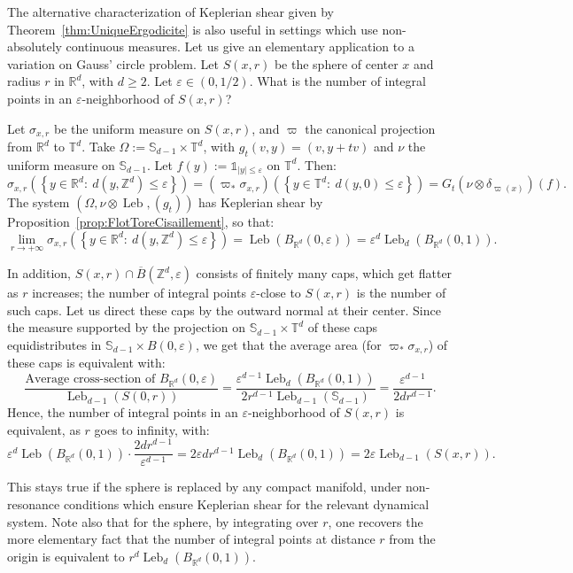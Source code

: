 \documentclass[AHL,Unicode,longabstracts]{cedram}
\DeclareMathOperator{\Leb}{Leb}
\newcommand{\Z}{\mathbb{Z}}
\newcommand{\R}{\mathbb{R}}
\newcommand{\Sbb}{\mathbb{S}}
\newcommand{\Tbb}{\mathbb{T}}
\newcommand*{\un}{\mathds{1}}
\begin{document}
The alternative characterization of Keplerian shear given by Theorem~\ref{thm:UniqueErgodicite} is also useful in settings which use non-absolutely continuous measures. Let us give an elementary application to a variation on Gauss' circle problem. Let $S(x,r)$ be the sphere of center $x$ and radius $r$ in $\R^d$, with $d \geq 2$. Let $\varepsilon \in (0, 1/2)$. What is the number of integral points in an $\varepsilon$-neighborhood of $S(x,r)$?


Let $\sigma_{x,r}$ be the uniform measure on $S (x,r)$, and $\varpi$ the canonical projection from $\R^d$ to $\Tbb^d$. Take $\Omega := \Sbb_{d-1} \times \Tbb^d$, with $g_t (v,y) = (v,y+tv)$ and $\nu$ the uniform measure on $\Sbb_{d-1}$. Let $f(y) := \un_{|y| \leq \varepsilon}$ on $\Tbb^d$. Then:
\[
\sigma_{x,r} \left(\!\left\{y \in \R^d: \ d(y,\Z^d) \leq \varepsilon\right\}\!\right)\!=\!(\varpi_*\sigma_{x,r}) \left(\left\{y\in \Tbb^d: \ d(y,0) \leq \varepsilon\right\}\right)\!=\!G_t (\nu \otimes \delta_{\varpi (x)}) (f).
\]
The system $(\Omega, \nu \otimes \Leb, (g_t))$ has Keplerian shear by Proposition~\ref{prop:FlotToreCisaillement}, so that:
\[
\lim_{r \to + \infty} \sigma_{x,r} \left(\left\{y \in \R^d: \ d(y,\Z^d) \leq \varepsilon\right\}\right) = \Leb (B_{\R^d} (0, \varepsilon)) = \varepsilon^d \Leb_d (B_{\R^d} (0, 1)).
\]

In addition, $S(x,r) \cap\overline{B}(\Z^d, \varepsilon)$ consists of finitely many caps, which get flatter as $r$ increases; the number of integral points $\varepsilon$-close to $S(x,r)$ is the number of such caps. Let us direct these caps by the outward normal at their center. Since the measure supported by the projection on $\Sbb_{d-1} \times \Tbb^d$ of these caps equidistributes in $\Sbb_{d-1} \times B(0,\varepsilon)$, we get that the average area (for $\varpi_* \sigma_{x,r}$) of these caps is equivalent with:
\[
\frac{\text{Average cross-section of } B_{\R^d}(0,\varepsilon)}{\Leb_{d-1} (S(0,r))} = \frac{\varepsilon^{d-1} \Leb_d (B_{\R^d}(0,1))}{2 r^{d-1} \Leb_{d-1} (\Sbb_{d-1})} = \frac{\varepsilon^{d-1}}{2 d r^{d-1}}.
\]
Hence, the number of integral points in an $\varepsilon$-neighborhood of $S(x,r)$ is equivalent, as $r$ goes to infinity, with:
\[
\varepsilon^d \Leb (B_{\R^d} (0, 1)) \cdot \frac{2 d r^{d-1}}{\varepsilon^{d-1}} = 2 \varepsilon d r^{d-1} \Leb_d (B_{\R^d} (0, 1)) = 2 \varepsilon \Leb_{d-1} (S (x, r)).
\]

This stays true if the sphere is replaced by any compact manifold, under non-resonance conditions which ensure Keplerian shear for the relevant dynamical system. Note also that for the sphere, by integrating over $r$, one recovers the more elementary fact that the number of integral points at distance $r$ from the origin is equivalent to $r^d \Leb_d (B_{\R^d}(0,1))$.
\end{document}
